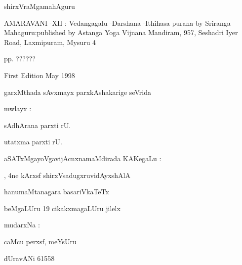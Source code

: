 \vskip 5cm

\begin{center}
{\large shirxVraMgamahAguru}
\end{center}

\newpage

{\eng AMARAVANI -XII : Vedangagalu -Darshana -Ithihasa purana-by Sriranga Mahaguru:published by Astanga Yoga Vijnana Mandiram, 957, Seshadri Iyer Road, Laxmipuram, Mysuru 4}

\medskip
{\eng pp. ??????}%

\medskip
{\eng First Edition May 1998}

\medskip

garxMthada sAvxmayx parxkAshakarige seVrida

\vskip 3cm
\begin{center}
mwlayx :

sAdhArana parxti rU.

utatxma parxti rU.
\end{center}

\vskip 2cm

\begin{center}
aSATxMgayoVgavijAcnxnamaMdirada KAKegaLu :

, 4ne kArxsf \hspace{1cm}  shirxVsadugxruvidAyxshAlA

\medskip
hanumaMtanagara \hspace{2.5cm} basariVkaTeTx

\medskip
beMgaLUru 19 \hspace{1.3cm} cikakxmagaLUru jilelx
\end{center}

\vskip 2cm

\begin{center}
mudarxNa :

caMcu perxsf, meYsUru

dUravANi {\rm 61558}
\end{center}
